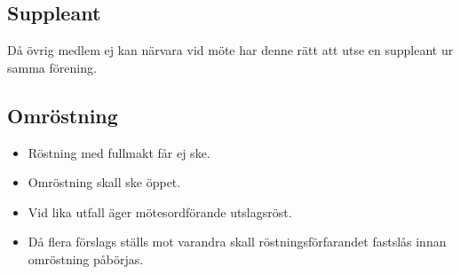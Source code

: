 \subsection{Suppleant} 
Då övrig medlem ej kan närvara vid möte har denne rätt att utse en suppleant ur samma förening. 
\subsection{Omröstning} 
\begin{itemize}
  \item Röstning med fullmakt får ej ske. 
  \item Omröstning skall ske öppet. 
  \item Vid lika utfall äger mötesordförande utslagsröst. 
  \item Då flera förslags ställs mot varandra skall röstningsförfarandet fastslås innan omröstning påbörjas.
\end{itemize}
\newpage
